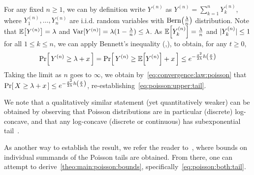 \documentclass[10pt]{article}
\newcommand{\bennettfunc}{h}
\newcommand{\bennett}[1]{\bennettfunc\mleft(#1\mright)}
\begin{document}
For any fixed $n\geq 1$, we can by definition write $Y^{(n)}$ as $Y^{(n)}=\sum_{k=1}^n Y_k^{(n)}$, where $Y^{(n)}_1,\dots,Y^{(n)}_n$ are i.i.d. random variables with $\operatorname{Bern}\!\left( \frac{\lambda}{n} \right)$ distribution. Note that $\mathbb{E}\!\left[Y^{(n)}\right]=\lambda$ and $\operatorname{Var}[Y^{(n)}] = \lambda(1-\frac{\lambda}{n}) \leq \lambda$. As
$\mathbb{E}\!\left[Y_k^{(n)}\right] = \frac{\lambda}{n}$ and $\lvert Y_k^{(n)} \rvert\leq 1$ for all $1\leq k\leq n$, we can apply Bennett's inequality (\cite[Chapter 2]{Boucheron:13},\cite[Chapter 2.5]{Pollard:15}), to obtain, for any $t\geq 0$,
\[
    \probaOf{ Y^{(n)} \geq \lambda + x }
    = \probaOf{ Y^{(n)} \geq \expect{Y^{(n)}} + x }
    \leq e^{ -\frac{x^2}{2\lambda} \bennett{\frac{x}{\lambda}} }
\]
Taking the limit as $n$ goes to $\infty$, we obtain by~\eqref{eq:convergence:law:poisson} that $\probaOf{X \geq \lambda + x } \leq e^{ -\frac{x^2}{2\lambda} \bennett{\frac{x}{\lambda}} }$, re-establishing~\eqref{eq:poisson:upper:tail}.

\begin{remark}
We note that a qualitatively similar statement (yet quantitatively weaker) can be obtained by observing that Poisson distributions are in particular (discrete) log-concave, and that any log-concave (discrete or continuous) has subexponential tail~\cite{An:95}.
\end{remark}

\begin{remark}
As another way to establish the result, we refer the reader to~\cite[Proposition 11.15]{Gol:17}, where bounds on individual summands of the Poisson tails are obtained. From there, one can attempt to derive~\autoref{theo:main:poisson:bounds}, specifically~\eqref{eq:poisson:both:tail}.
\end{remark}
  
   
\end{document}
